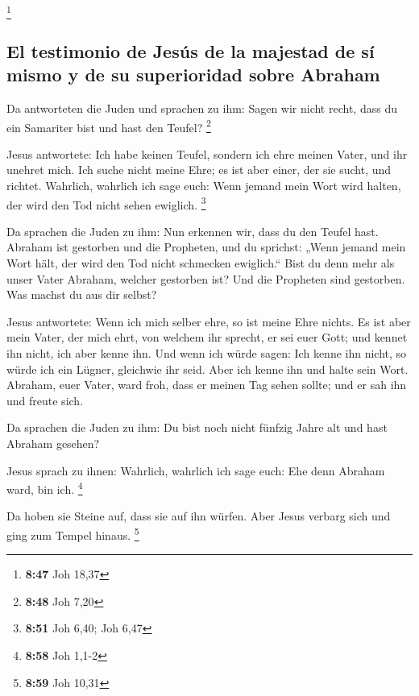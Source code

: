 \footnote{\textbf{8:47} Joh 18,37}

\hypertarget{el-testimonio-de-jesuxfas-de-la-majestad-de-suxed-mismo-y-de-su-superioridad-sobre-abraham}{%
\subsection{El testimonio de Jesús de la majestad de sí mismo y de su
superioridad sobre
Abraham}\label{el-testimonio-de-jesuxfas-de-la-majestad-de-suxed-mismo-y-de-su-superioridad-sobre-abraham}}

 Da antworteten die Juden und sprachen zu ihm: Sagen wir
nicht recht, dass du ein Samariter bist und hast den Teufel? \footnote{\textbf{8:48}
  Joh 7,20}

 Jesus antwortete: Ich habe keinen Teufel, sondern ich
ehre meinen Vater, und ihr unehret mich.  Ich suche nicht
meine Ehre; es ist aber einer, der sie sucht, und richtet.
 Wahrlich, wahrlich ich sage euch: Wenn jemand mein Wort
wird halten, der wird den Tod nicht sehen ewiglich. \footnote{\textbf{8:51}
  Joh 6,40; Joh 6,47}

 Da sprachen die Juden zu ihm: Nun erkennen wir, dass du
den Teufel hast. Abraham ist gestorben und die Propheten, und du
sprichst: „Wenn jemand mein Wort hält, der wird den Tod nicht schmecken
ewiglich.``  Bist du denn mehr als unser Vater Abraham,
welcher gestorben ist? Und die Propheten sind gestorben. Was machst du
aus dir selbst?

 Jesus antwortete: Wenn ich mich selber ehre, so ist
meine Ehre nichts. Es ist aber mein Vater, der mich ehrt, von welchem
ihr sprecht, er sei euer Gott;  und kennet ihn nicht, ich
aber kenne ihn. Und wenn ich würde sagen: Ich kenne ihn nicht, so würde
ich ein Lügner, gleichwie ihr seid. Aber ich kenne ihn und halte sein
Wort.  Abraham, euer Vater, ward froh, dass er meinen Tag
sehen sollte; und er sah ihn und freute sich.

 Da sprachen die Juden zu ihm: Du bist noch nicht fünfzig
Jahre alt und hast Abraham gesehen?

 Jesus sprach zu ihnen: Wahrlich, wahrlich ich sage euch:
Ehe denn Abraham ward, bin ich. \footnote{\textbf{8:58} Joh 1,1-2}

 Da hoben sie Steine auf, dass sie auf ihn würfen. Aber
Jesus verbarg sich und ging zum Tempel hinaus. \footnote{\textbf{8:59}
  Joh 10,31}

